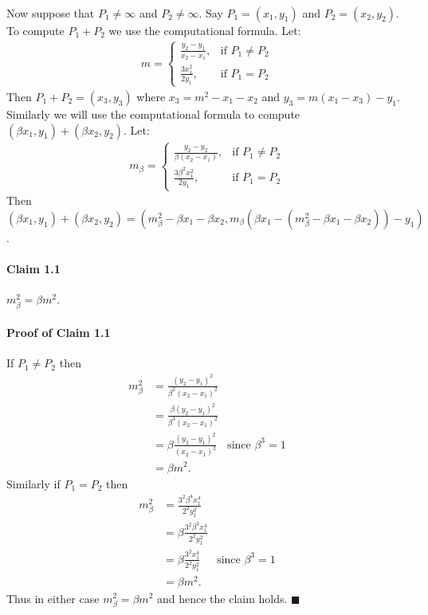 \documentclass[letterpaper,12pt,oneside,onecolumn]{article}
\begin{document}
\paragraph{}
Now suppose that $P_1 \neq \infty$ and $P_2 \neq \infty$. Say $P_1 = (x_1, y_1)$ and $P_2 = (x_2, y_2)$. To compute $P_1 + P_2$ we use the computational formula. Let:
\begin{align*}
m = \begin{cases}
\frac{y_2 - y_1}{x_2 - x_1}, &\text{if $P_1 \neq P_2$}\\
\frac{3x_1^2}{2y_1}, &\text{if $P_1 = P_2$}
\end{cases}
\end{align*}
Then $P_1 + P_2 = (x_3, y_3)$ where $x_3 = m^2 - x_1 - x_2$ and $y_3 = m(x_1 - x_3) - y_1$. Similarly we will use the computational formula to compute $(\beta x_1, y_1) + (\beta x_2, y_2)$. Let:
\begin{align*}
m_{\beta} = \begin{cases}
\frac{y_2 - y_2}{\beta(x_2 - x_1)}, &\text{if $P_1 \neq P_2$} \\
\frac{3\beta^2x_1^2}{2y_1}, &\text{if $P_1 = P_2$}
\end{cases}\end{align*}
Then $(\beta x_1, y_1) + (\beta x_2, y_2) = (m_\beta^2 - \beta x_1 - \beta x_2, m_\beta(\beta x_1 - (m_\beta^2 - \beta x_1 - \beta x_2)) -y_1)$.
\paragraph{Claim 1.1}
$m_\beta^2= \beta m^2$.
\paragraph{Proof of Claim 1.1}
If $P_1 \neq P_2$ then
\begin{align}
m_\beta^2 &= \frac{(y_2 - y_1)^2}{\beta^2(x_2-x_1)^2} \nonumber\\
&= \frac{\beta(y_2 - y_1)^2}{\beta^3(x_2-x_1)^2} \nonumber\\
&= \beta\frac{(y_2 - y_1)^2}{(x_2-x_1)^2} &\text{since $\beta^3 = 1$}\nonumber\\
&= \beta m^2.\nonumber
\end{align}
Similarly if $P_1 = P_2$ then
\begin{align*}
m_\beta^2 &= \frac{3^2 \beta^4 x_1^4}{2^2y_1^2} \\
&= \beta\frac{3^2\beta^3x_1^4}{2^2y_1^2} \\
&= \beta\frac{3^2x_1^4}{2^2y_1^2} &\text{since $\beta^3 = 1$}\\
&= \beta m^2.
\end{align*}
Thus in either case $m_\beta^2 = \beta m^2$ and hence the claim holds. $\blacksquare$
\end{document}
